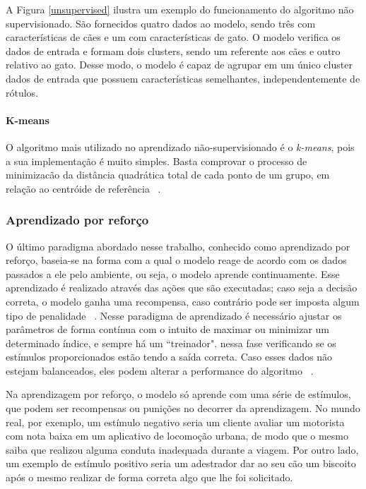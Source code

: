           A Figura \ref{unsupervised} ilustra um exemplo do funcionamento do algoritmo não supervisionado. São fornecidos quatro dados ao modelo, sendo três com características de cães e um com características de gato. O modelo verifica os dados de entrada e formam dois clusters, sendo um referente aos cães e outro relativo ao gato. Desse modo, o modelo é capaz de agrupar em um único cluster dados de entrada que possuem características semelhantes, independentemente de rótulos.


          \paragraph{K-means}
          O algoritmo mais utilizado no aprendizado não-supervisionado é o \textit{k-means}, pois a sua implementação é muito simples. Basta comprovar
          o processo de minimizacão da distância quadrática total de cada ponto de um grupo, em relação ao centróide de referência ~\cite{macqueen1967some}. 


    \subsubsection{Aprendizado por reforço}

          O último paradigma abordado nesse trabalho, conhecido como aprendizado por reforço, baseia-se na forma com a qual o modelo reage de acordo com os dados passados a ele pelo ambiente, ou seja, o modelo aprende continuamente. 
          Esse aprendizado é realizado através das ações que são executadas; caso seja a decisão correta, o modelo ganha uma recompensa, caso
          contrário pode ser imposta algum tipo de penalidade ~\cite{zurada}. Nesse paradigma de aprendizado é necessário ajustar os parâmetros de forma
          contínua com o intuito de maximar ou minimizar um determinado índice, e sempre há um ``treinador". nessa fase verificando se os estímulos proporcionados
          estão tendo a saída correta. Caso esses dados não estejam balanceados, eles podem alterar a performance do algoritmo ~\cite{mazurowski2008training}.


          Na aprendizagem por reforço, o modelo só aprende com uma série de estímulos, que podem ser recompensas ou punições no decorrer da aprendizagem. No mundo real, por exemplo, um estímulo negativo seria um cliente avaliar um motorista com nota baixa em um aplicativo de locomoção urbana, de modo que o mesmo saiba que realizou alguma conduta inadequada durante a viagem. Por outro lado, um exemplo de estímulo positivo seria um adestrador dar ao seu cão um biscoito após o mesmo realizar de forma correta algo que lhe foi solicitado.

